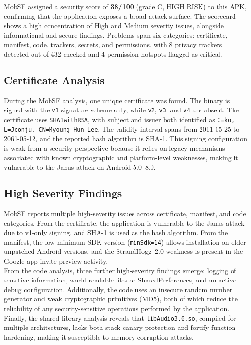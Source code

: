 MobSF assigned a security score of \textbf{38/100} (grade C, HIGH RISK) to this APK, confirming that the application exposes a broad attack surface. The scorecard shows a high concentration of High and Medium severity issues, alongside informational and secure findings. Problems span six categories: certificate, manifest, code, trackers, secrets, and permissions, with 8 privacy trackers detected out of 432 checked and 4 permission hotspots flagged as critical.

\subsection{Certificate Analysis}
During the MobSF analysis, one unique certificate was found. The binary is signed with the \texttt{v1} signature scheme only, while \texttt{v2}, \texttt{v3}, and \texttt{v4} are absent. The certificate uses \texttt{SHA1withRSA}, with subject and issuer both identified as \texttt{C=ko, L=Jeonju, CN=Myoung-Hun Lee}. The validity interval spans from 2011-05-25 to 2061-05-12, and the reported hash algorithm is SHA-1. This signing configuration is weak from a security perspective because it relies on legacy mechanisms associated with known cryptographic and platform-level weaknesses, making it vulnerable to the Janus attack on Android 5.0--8.0.

\subsection{High Severity Findings}
MobSF reports multiple high-severity issues across certificate, manifest, and code categories. From the certificate, the application is vulnerable to the Janus attack due to v1-only signing, and SHA-1 is used as the hash algorithm. From the manifest, the low minimum SDK version (\texttt{minSdk=14}) allows installation on older unpatched Android versions, and the StrandHogg~2.0 weakness is present in the Google app-invite preview activity.\\
From the code analysis, three further high-severity findings emerge: logging of sensitive information, world-readable files or SharedPreferences, and an active debug configuration. Additionally, the code uses an insecure random number generator and weak cryptographic primitives (MD5), both of which reduce the reliability of any security-sensitive operations performed by the application.\\
Finally, the shared library analysis reveals that \texttt{libAudio3.0.so}, compiled for multiple architectures, lacks both stack canary protection and fortify function hardening, making it susceptible to memory corruption attacks.

